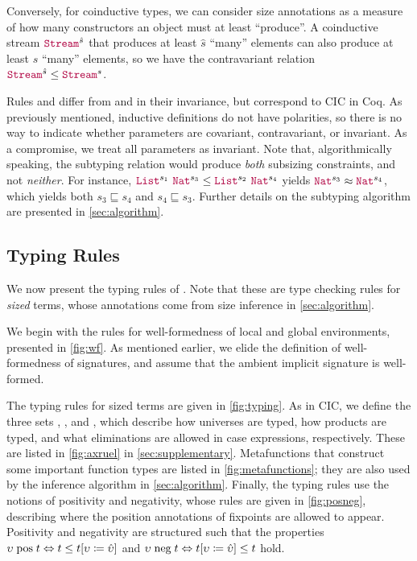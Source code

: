 Conversely, for coinductive types, we can consider size annotations as a measure of how many constructors an object must at least ``produce''. A coinductive stream $\Stream^{\hat{s}}$ that produces at least $\hat{s}$ ``many'' elements can also produce at least $s$ ``many'' elements, so we have the contravariant relation $\Stream^{\hat{s}} \leq \Stream^s$.

Rules  and  differ from \CIChat and \CIChatminus in their invariance, but correspond to CIC in Coq.
As previously mentioned, inductive definitions do not have polarities, so there is no way to indicate whether parameters are covariant, contravariant, or invariant.
As a compromise, we treat all parameters as invariant.
Note that, algorithmically speaking, the subtyping relation would produce \textit{both} subsizing constraints, and not \textit{neither}. For instance, $\List^{s_1} ~ \Nat^{s_3} \leq \List^{s_2} ~ \Nat^{s_4}$ yields $\Nat^{s_3} \approx \Nat^{s_4}$, which yields both $s_3 \sqsubseteq s_4$ and $s_4 \sqsubseteq s_3$.
Further details on the subtyping algorithm are presented in \autoref{sec:algorithm}.

\subsection{Typing Rules}\label{sec:typing:rules}

We now present the typing rules of \lang.
Note that these are type checking rules for \textit{sized} terms, whose annotations come from size inference in \autoref{sec:algorithm}.



We begin with the rules for well-formedness of local and global environments, presented in \autoref{fig:wf}.
As mentioned earlier, we elide the definition of well-formedness of signatures,
and assume that the ambient implicit signature is well-formed.







The typing rules for sized terms are given in \autoref{fig:typing}. As in CIC, we define the three sets \Axioms, \Rules, and \Elims, which describe how universes are typed, how products are typed, and what eliminations are allowed in case expressions, respectively.
These are listed in \autoref{fig:axruel} in \autoref{sec:supplementary}.
Metafunctions that construct some important function types are listed in \autoref{fig:metafunctions}; they are also used by the inference algorithm in \autoref{sec:algorithm}.
Finally, the typing rules use the notions of positivity and negativity, whose rules are given in \autoref{fig:posneg}, describing where the position annotations of fixpoints are allowed to appear.
Positivity and negativity are structured such that the properties $\upsilon \mathrel{\text{pos}} t \Leftrightarrow t \leq t [\upsilon \coloneqq \hat{\upsilon}]$ and $\upsilon \mathrel{\text{neg}} t \Leftrightarrow t [\upsilon \coloneqq \hat{\upsilon}] \leq t$ hold.

